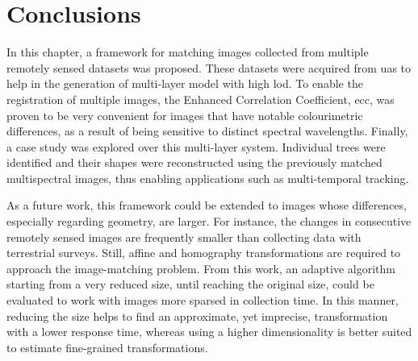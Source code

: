 \section{Conclusions}

In this chapter, a framework for matching images collected from multiple remotely sensed datasets was proposed. These datasets were acquired from \acrshort{uas} to help in the generation of multi-layer model with high \acrshort{lod}. To enable the registration of multiple images, the Enhanced Correlation Coefficient, \acrshort{ecc}, was proven to be very convenient for images that have notable colourimetric differences, as a result of being sensitive to distinct spectral wavelengths. Finally, a case study was explored over this multi-layer system. Individual trees were identified and their shapes were reconstructed using the previously matched multispectral images, thus enabling applications such as multi-temporal tracking.

As a future work, this framework could be extended to images whose differences, especially regarding geometry, are larger. For instance, the changes in consecutive remotely sensed images are frequently smaller than collecting data with terrestrial surveys. Still, affine and homography transformations are required to approach the image-matching problem. From this work, an adaptive algorithm starting from a very reduced size, until reaching the original size, could be evaluated to work with images more sparsed in collection time. In this manner, reducing the size helps to find an approximate, yet imprecise, transformation with a lower response time, whereas using a higher dimensionality is better suited to estimate fine-grained transformations.

